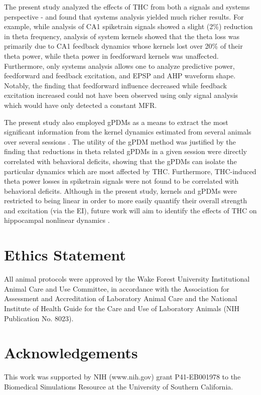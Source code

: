 \documentclass[11pt,a4paper,final]{article}
\begin{document}
The present study analyzed the effects of THC from both a signals and systems perspective - and found that systems analysis yielded much richer results.
For example, while analysis of CA1 spiketrain signals showed a slight (2\%) reduction in theta frequency, analysis of system kernels showed that the theta loss was primarily due to CA1 feedback dynamics whose kernels lost over 20\% of their theta power, while theta power in feedforward kernels was unaffected.
Furthermore, only systems analysis allows one to analyze predictive power, feedforward and feedback excitation, and EPSP and AHP waveform shape. Notably, the finding that feedforward influence decreased while feedback excitation increased could not have been observed using only signal analysis which would have only detected a constant MFR.

The present study also employed gPDMs as a means to extract the most significant information from the kernel dynamics estimated from several animals over several sessions \citep{marm04,marm14,sandler14,sandler15clpp}.
The utility of the gPDM method was justified by the finding that reductions in theta related gPDMs in a given session were directly correlated with behavioral deficits, showing that the gPDMs can isolate the particular dynamics which are most affected by THC.
Furthermore, THC-induced theta power losses in spiketrain signals were not found to be correlated with behavioral deficits.
Although in the present study, kernels and gPDMs were restricted to being linear in order to more easily quantify their overall strength and excitation (via the EI), future work will aim to identify the effects of THC on hippocampal nonlinear dynamics \citep{song07,sandler15}.

\section*{Ethics Statement}
All animal protocols were approved by the Wake Forest University Institutional Animal Care and Use Committee, in accordance with the Association for Assessment and Accreditation of Laboratory Animal Care and the National Institute of Health Guide for the Care and Use of Laboratory Animals (NIH Publication No. 8023).

\section*{Acknowledgements}
This work was supported by NIH (www.nih.gov) grant P41-EB001978 to the Biomedical Simulations Resource at the University of Southern California.
\end{document}
